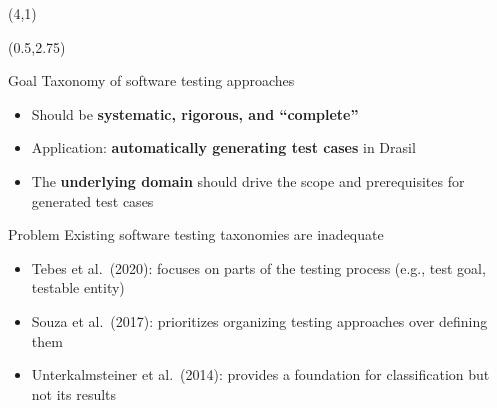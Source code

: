 \documentclass[22pt]{beamer}
\begin{document}
\begin{frame}[fragile]
    \begin{textblock}{8}(4,1)
        \titlepage
    \end{textblock}

    \begin{textblock}{7.25}(0.5,2.75)
        \begin{block}{\fontsize{37}{20}\selectfont Goal}
            Taxonomy of software testing approaches
            \begin{itemize}
                \item Should be \textbf{systematic, rigorous, and ``complete''}
                \item Application: \textbf{automatically generating test cases}
                      in Drasil %
                \item The \textbf{underlying domain} should drive the scope and
                      prerequisites for generated test cases
            \end{itemize}

            \vspace{5mm}
        \end{block}

        \begin{block}{\fontsize{37}{20}\selectfont Problem}
            Existing software testing taxonomies are inadequate
            \begin{itemize}
                \item Tebes et al.~(2020): focuses on parts of the
                      testing process (e.g., test goal, testable entity)
                \item Souza et al.~(2017): prioritizes organizing testing
                      approaches over defining them
                \item Unterkalmsteiner et al.~(2014): provides a foundation for
                      classification but not its results
            \end{itemize}
            \vspace{5mm}
        \end{block}


\end{textblock}
\end{frame}
\end{document}

